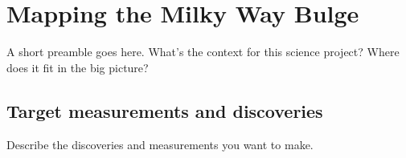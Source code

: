 %
%
%
%
%
%
%

\section{Mapping the Milky Way Bulge}
\def\secname{MW_Bulge}\label{sec:\secname} %



A short preamble goes here. What's the context for this science
project? Where does it fit in the big picture?


\subsection{Target measurements and discoveries}
\label{sec:\secname:MW_Bulge_targets}

Describe the discoveries and measurements you want to make.


